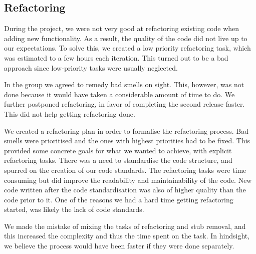 \subsection{Refactoring}
During the project, we were not very good at refactoring existing code when adding new functionality. As a result, the quality of the code did not live up to our expectations. To solve this, we created a low priority refactoring task, which was estimated to a few hours each iteration. This turned out to be a bad approach since low-priority tasks were usually neglected. 

In the group we agreed to remedy bad smells on sight. This, however, was not done because it would have taken a considerable amount of time to do. We further postponed refactoring, in favor of completing the second release faster. This did not help getting refactoring done.

We created a refactoring plan in order to formalise the refactoring process. Bad smells were prioritised and the ones with highest priorities had to be fixed. This provided some concrete goals for what we wanted to achieve, with explicit refactoring tasks. There was a need to standardise the code structure, and spurred on the creation of our code standards. The refactoring tasks were time consuming but did improve the readability and maintainability of the code. New code written after the code standardisation was also of higher quality than the code prior to it. One of the reasons we had a hard time getting refactoring started, was likely the lack of code standards.

We made the mistake of mixing the tasks of refactoring and stub removal, and this  increased the complexity and thus the time spent on the task. In hindsight, we believe the process would have been faster if they were done separately.